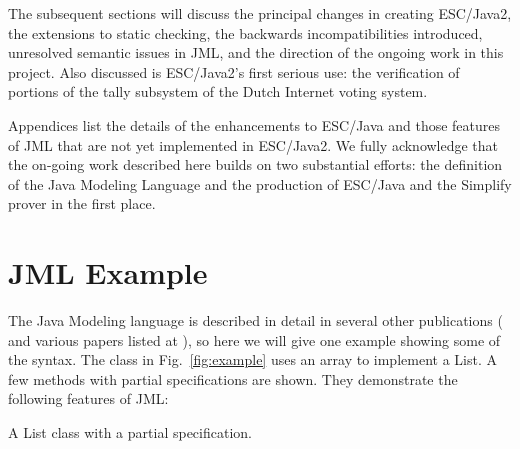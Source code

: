 \documentclass{llncs}
\begin{document}
The subsequent sections will discuss the principal changes in creating
ESC/Java2, the extensions to static checking, the backwards
incompatibilities introduced, unresolved semantic issues in JML, and
the direction of the ongoing work in this project.  Also discussed is
ESC/Java2's first serious use: the verification of portions of the
tally subsystem of the Dutch Internet voting system.

Appendices list the details of the enhancements to ESC/Java and those
features of JML that are not yet implemented in ESC/Java2.  We fully
acknowledge that the on-going work described here builds on two
substantial efforts: the definition of the Java Modeling Language and
the production of ESC/Java and the Simplify prover in the first place.

\section{JML Example}
The Java Modeling language is described in detail in several other publications
(\cite{Leavens-etal00} and various papers listed at \cite{jmlpapers}), so here we will give one example showing some of the syntax.  The class in Fig.~\ref{fig:example}
uses an array to implement a List.  A few methods with partial specifications are shown.
They demonstrate the following features of JML:
\begin{BFIGURE}

\caption{A List class with a partial specification.}
\label{fig:example}
\end{BFIGURE}
\end{document}
